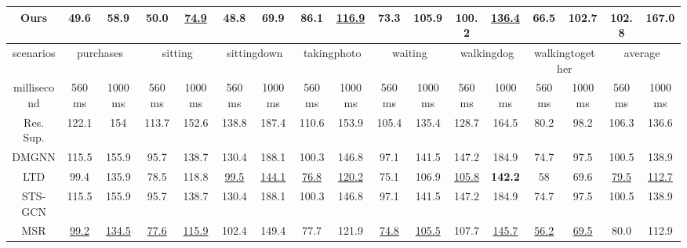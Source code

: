 \begin{table}[h]
{\begin{tabular}{c|cc|cc|cc|cc|cc|cc|cc|cc}
        Ours   & \textbf{49.6} & \textbf{58.9}  & \textbf{50.0} & \underline{74.9}           & \textbf{48.8}  & \textbf{69.9}  & \textbf{86.1}  & \underline{116.9}          & \textbf{73.3} & \textbf{105.9} & \textbf{100.2} & \underline{136.4}          & \textbf{66.5}    & \textbf{102.7}   & \textbf{102.8} & \textbf{167.0} \\ \hline
        scenarios   & \multicolumn{2}{c|}{purchases}  & \multicolumn{2}{c|}{sitting}    & \multicolumn{2}{c|}{sittingdown} & \multicolumn{2}{c|}{takingphoto} & \multicolumn{2}{c|}{waiting}    & \multicolumn{2}{c|}{walkingdog}  & \multicolumn{2}{c|}{walkingtogether} & \multicolumn{2}{c}{average}         \\ \hline
        millisecond & 560ms         & 1000ms         & 560ms         & 1000ms         & 560ms          & 1000ms         & 560ms          & 1000ms         & 560ms         & 1000ms         & 560ms          & 1000ms         & 560ms            & 1000ms           & 560ms          & 1000ms         \\ \hline
        Res. Sup.   & 122.1         & 154            & 113.7         & 152.6          & 138.8          & 187.4          & 110.6          & 153.9          & 105.4         & 135.4          & 128.7          & 164.5          & 80.2             & 98.2             & 106.3          & 136.6          \\
        DMGNN & 115.5         & 155.9          & 95.7          & 138.7          & 130.4          & 188.1          & 100.3          & 146.8          & 97.1          & 141.5          & 147.2          & 184.9          & 74.7             & 97.5             & 100.5          & 138.9          \\
        LTD   & 99.4          & 135.9          & 78.5          & 118.8          & \underline{99.5}           & \underline{144.1}          & \underline{76.8}           & \underline{120.2}          & 75.1          & 106.9          & \underline{105.8}          & \textbf{142.2} & 58               & 69.6             & \underline{79.5}           & \underline{112.7}          \\
        STS-GCN & 115.5         & 155.9          & 95.7          & 138.7          & 130.4          & 188.1          & 100.3          & 146.8          & 97.1          & 141.5          & 147.2          & 184.9          & 74.7             & 97.5             & 100.5          & 138.9          \\
        MSR   & \underline{99.2}          & \underline{134.5}          & \underline{77.6}          & \underline{115.9}          & 102.4          & 149.4          & 77.7           & 121.9          & \underline{74.8}          & \underline{105.5}          & 107.7          & \underline{145.7}          & \underline{56.2}             & \underline{69.5}             & 80.0           & 112.9          \\

\end{tabular}}
\end{table}
